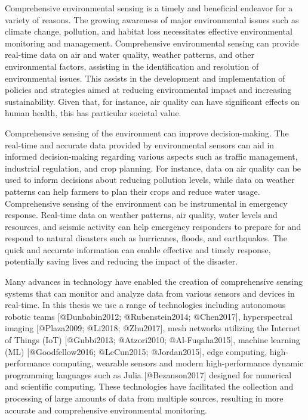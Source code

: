 Comprehensive environmental sensing is a timely and beneficial endeavor for a variety of reasons. The growing awareness of major environmental issues such as climate change, pollution, and habitat loss necessitates effective environmental monitoring and management. Comprehensive environmental sensing can provide real-time data on air and water quality, weather patterns, and other environmental factors, assisting in the identification and resolution of environmental issues. This assists in the development and implementation of policies and strategies aimed at reducing environmental impact and increasing sustainability. Given that, for instance, air quality can have significant effects on human health, this has particular societal value.

Comprehensive sensing of the environment can improve decision-making. The real-time and accurate data provided by environmental sensors can aid in informed decision-making regarding various aspects such as traffic management, industrial regulation, and crop planning. For instance, data on air quality can be used to inform decisions about reducing pollution levels, while data on weather patterns can help farmers to plan their crops and reduce water usage. Comprehensive sensing of the environment can be instrumental in emergency response. Real-time data on weather patterns, air quality, water levels and resources, and seismic activity can help emergency responders to prepare for and respond to natural disasters such as hurricanes, floods, and earthquakes. The quick and accurate information can enable effective and timely response, potentially saving lives and reducing the impact of the disaster.

Many advances in technology have enabled the creation of comprehensive sensing systems that can monitor and analyze data from various sensors and devices in real-time. In this thesis we use a range of technologies including autonomous robotic teams [@Dunbabin2012; @Rubenstein2014; @Chen2017], hyperspectral imaging [@Plaza2009; @Li2018; @Zhu2017], mesh networks utilizing the Internet of Things (IoT) [@Gubbi2013; @Atzori2010; @Al-Fuqaha2015], machine learning (ML) [@Goodfellow2016; @LeCun2015; @Jordan2015], edge computing, high-performance computing,  wearable sensors and modern high-performance dynamic programming languages such as Julia [@Bezanson2017] designed for numerical and scientific computing. These technologies have facilitated the collection and processing of large amounts of data from multiple sources, resulting in more accurate and comprehensive environmental monitoring.



